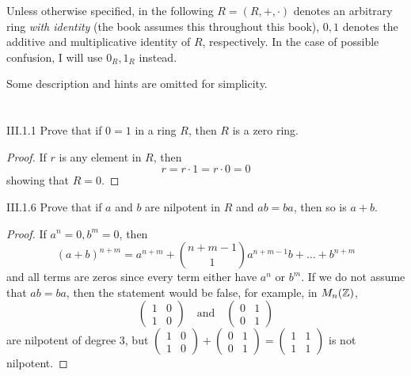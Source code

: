 Unless otherwise specified, in the following $R = (R,+,\cdot)$ denotes an arbitrary ring \emph{with identity} (the book assumes this throughout this book), $0, 1$ denotes the additive and multiplicative identity of $R$, respectively. In the case of possible confusion, I will use $0_R, 1_R$ instead. 

Some description and hints are omitted for simplicity.

\section{}

\begin{problem}{III.1.1}
Prove that if $0 = 1$ in a ring $R$, then $R$ is a zero ring.
\end{problem}
\begin{proof}
If $r$ is any element in $R$, then
\[
r = r \cdot 1 = r \cdot 0 = 0  
\]
showing that $R = 0$.
\end{proof}
\begin{problem}{III.1.6}
Prove that if $a$ and $b$ are nilpotent in $R$ and $ab = ba$, then so is $a+b$.
\end{problem}
\begin{proof}
If $a^n = 0, b^m = 0$, then
\[
(a+b)^{n+m} = a^{n+m} +\binom{n+m-1}{1} a^{n+m-1}b + \dotsc + b^{n+m}
\]
and all terms are zeros since every term either have $a^n$ or $b^m$. If we do not assume that $ab = ba$, then the statement would be false, for example, in $M_n(\mathbb{Z})$,
\[
\begin{pmatrix} 
1 & 0 \\
1 & 0
\end{pmatrix}
\quad \text{and} \quad
\begin{pmatrix} 
0 & 1 \\
0 & 1 
\end{pmatrix}
\]
are nilpotent of degree $3$, but
$\begin{pmatrix} 
1 & 0 \\
1 & 0
\end{pmatrix} + 
\begin{pmatrix} 
0 & 1 \\
0 & 1 
\end{pmatrix} = 
\begin{pmatrix} 
1 & 1 \\
1 & 1
\end{pmatrix}$ is not nilpotent.
\end{proof}

